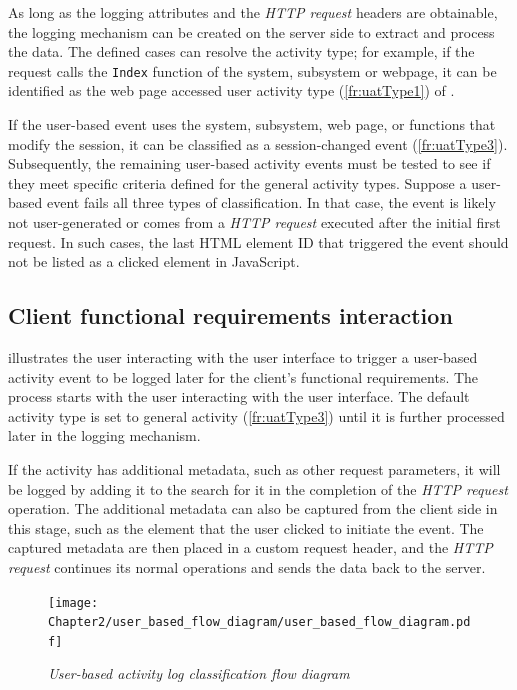As long as the logging attributes and the \textit{HTTP request} headers are obtainable, the logging mechanism can be created on the server side to extract and process the data. The defined cases can resolve the activity type; for example, if the request calls the \texttt{Index} function of the system, subsystem or webpage, it can be identified as the web page accessed user activity type (\ref{fr:uatType1}) of . \par If the user-based event uses the system, subsystem, web page, or functions that modify the session, it can be classified as a session-changed event (\ref{fr:uatType3}). Subsequently, the remaining user-based activity events must be tested to see if they meet specific criteria defined for the general activity types. Suppose a user-based event fails all three types of classification. In that case, the event is likely not user-generated or comes from a \textit{HTTP request} executed after the initial first request. In such cases, the last HTML element ID that triggered the event should not be listed as a clicked element in JavaScript.

\subsection{Client functional requirements interaction}
 illustrates the user interacting with the user interface to trigger a user-based activity event to be logged later for the client's functional requirements. The process starts with the user interacting with the user interface. The default activity type is set to general activity (\ref{fr:uatType3}) until it is further processed later in the logging mechanism. \par If the activity has additional metadata, such as other request parameters, it will be logged by adding it to the search for it in the completion of the \textit{HTTP request} operation. The additional metadata can also be captured from the client side in this stage, such as the element that the user clicked to initiate the event. The captured metadata are then placed in a custom request header, and the \textit{HTTP request} continues its normal operations and sends the data back to the server.

\clearpage

\begin{figure}[!htb] %
	\centering %
	\texttt{[image: Chapter2/user\_based\_flow\_diagram/user\_based\_flow\_diagram.pdf]}
	\caption[User-based activity log classification flow diagram]
	{\textit{User-based activity log classification flow diagram}}\label{fig:ch2_user_based_actvity_classification}
\end{figure}

